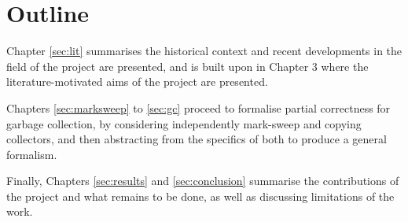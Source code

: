 \section{Outline}
\label{sec:intro-outline}

Chapter \ref{sec:lit} summarises the historical context and recent
developments in the field of the project are presented, and is built
upon in Chapter 3 where the literature-motivated aims of the project
are presented.

Chapters \ref{sec:marksweep} to \ref{sec:gc} proceed to formalise
partial correctness for garbage collection, by considering
independently mark-sweep and copying collectors, and then abstracting
from the specifics of both to produce a general formalism.

Finally, Chapters \ref{sec:results} and \ref{sec:conclusion} summarise
the contributions of the project and what remains to be done, as well
as discussing limitations of the work.
